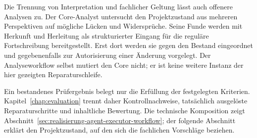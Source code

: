 Die Trennung von Interpretation und fachlicher Geltung lässt auch
offenere Analysen zu. Der Core-Analyst untersucht den Projektzustand
aus mehreren Perspektiven auf mögliche Lücken und Widersprüche.
Seine Funde werden mit Herkunft und Herleitung als strukturierter
Eingang für die reguläre Fortschreibung bereitgestellt. Erst dort
werden sie gegen den Bestand eingeordnet und gegebenenfalls zur
Autorisierung einer Änderung vorgelegt. Der Analyseworkflow selbst
mutiert den Core nicht; er ist keine weitere Instanz der hier
gezeigten Reparaturschleife.

Ein bestandenes Prüfergebnis belegt nur die Erfüllung der
festgelegten Kriterien. Kapitel~\ref{chap:evaluation} trennt daher
Kontrollnachweise, tatsächlich ausgelöste Reparaturschritte und
inhaltliche Bewertung. Die technische Komposition zeigt
Abschnitt~\ref{sec:realisierung-agent-executor-workflow}; der
folgende Abschnitt erklärt den Projektzustand, auf den sich die
fachlichen Vorschläge beziehen.
